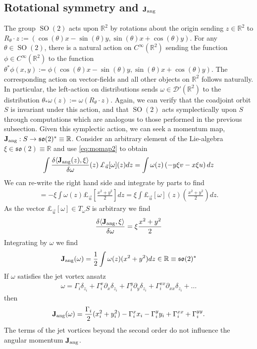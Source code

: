 \documentclass[12pt]{amsart}
\newcommand{\R}{\ensuremath{\mathbb{R}}}
\theoremstyle{remark}
\DeclareMathOperator{\SO}{SO}
\begin{document}
\subsection{Rotational symmetry and ${\bf J}_{\rm ang}$}
The group $\SO(2)$ acts upon $\mathbb{R}^2$ by rotations about the origin sending $z \in \R^2$ to $R_\theta \cdot z := ( \cos(\theta)x-\sin(\theta)y,\sin(\theta)x+\cos(\theta)y )$.
For any $\theta \in \SO(2)$, there is a natural action on $C^{\infty}(\mathbb{R}^2)$ sending the function $\phi \in C^{\infty}(\mathbb{R}^2)$ to the function $\theta^*\phi(x,y) := \phi(\cos(\theta)x-\sin(\theta)y,\sin(\theta)x+\cos(\theta)y)$.  The corresponding action on vector-fields and all other objects on $\mathbb{R}^2$ follows naturally.  
 In particular, the left-action on distributions sends $\omega \in \mathcal{D}'(\mathbb{R}^2)$ to the distribution $\theta_* \omega(z) := \omega( R_\theta \cdot z)$.
Again, we can verify that the coadjoint orbit $S$ is invariant under this action, and that $\SO(2)$ acts symplectically upon $S$
through computations which are analogous to those performed in the previous subsection.
Given this symplectic action, we can seek a momentum map, ${\bf J}_{\rm ang}:S \to \mathfrak{so}(2)^* \equiv \mathbb{R}$.  Consider an arbitrary element of the Lie-algebra $\xi \in \mathfrak{so}(2) \equiv \mathbb{R}$ and use \eqref{eq:momap2} to obtain
\begin{align*}
  \int  \frac{\delta  \langle {\bf J}_{\rm ang} (z) , \xi \rangle }{\delta \omega} (z) \, \pounds_{\vec{u}}[\omega] (z) dz
  = \int \omega(z) \left( -y\xi v - x\xi u \right) dz
\end{align*}
We can re-write the right hand side and integrate by parts to find
\begin{align*}
  = -\xi \int \omega(z) \pounds_{\vec{u}} \left[\frac{x^2+y^2}{2}\right] dz
  = \xi \int \pounds_{\vec{u}}[\omega](z) \left( \frac{x^2+y^2}{2} \right) dz.
\end{align*}
As the vector $\pounds_{\vec{u}}[\omega] \in T_\omega S$ is arbitrary we find
\begin{align*}
  \frac{\delta \langle {\bf J}_{\rm ang} , \xi \rangle}{\delta \omega} = \xi \frac{x^2+y^2}{2}
\end{align*}
Integrating by $\omega$ we find
\begin{align*}
    {\bf J}_{\rm ang}(\omega) = \frac{1}{2}\int \omega(z) ( x^2 + y^2) dz \in \mathbb{R} \equiv \mathfrak{so}(2)^*
\end{align*}
If $\omega$ satisfies the jet vortex ansatz
\begin{align*}
  \omega = \Gamma_i \delta_{z_i} + \Gamma_i^x \partial_x \delta_{z_i} + \Gamma_i^y \partial_y \delta_{z_i} + \Gamma_i^{xx} \partial_{xx} \delta_{z_i} + \dots
\end{align*}
then
\begin{align*}
  {\bf J}_{\rm ang}(\omega) = \frac{\Gamma_i}{2} (x_i^2 + y_i^2) - \Gamma_i^x x_i - \Gamma_i^y y_i + \Gamma_i^{xx} + \Gamma_i^{yy} .
\end{align*}
The terms of the jet vortices beyond the second order do not influence the angular momentum ${\bf J}_{\rm ang}$.



\end{document}
